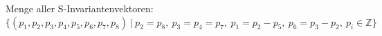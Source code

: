 \documentclass[a4paper,12pt]{scrartcl}
\begin{document}
\subsubsection{}
Menge aller S-Invariantenvektoren:\\
$\{(p_1,p_2,p_3,p_4,p_5,p_6,p_7,p_8)\ |\ p_2=p_8,\ p_3=p_4=p_7,\ p_1=p_2-p_5,\ p_6=p_3-p_2,\ p_i \in \mathbb{Z}\}$
\subsubsection{}
\end{document}
